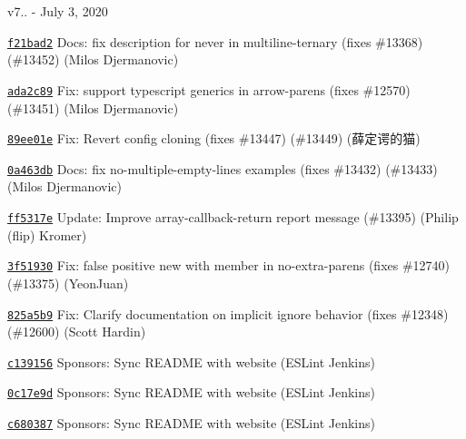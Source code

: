 v7.. -\/ July 3, 2020


\begin{DoxyItemize}
\item \href{https://github.com/eslint/eslint/commit/f21bad2680406a2671b877f8dba47f4475d0cc64}{\texttt{ {\ttfamily f21bad2}}} Docs\+: fix description for {\ttfamily never} in multiline-\/ternary (fixes \#13368) (\#13452) (Milos Djermanovic)
\item \href{https://github.com/eslint/eslint/commit/ada2c891298382f82dfabf37cacd59a1057b2bb7}{\texttt{ {\ttfamily ada2c89}}} Fix\+: support typescript generics in arrow-\/parens (fixes \#12570) (\#13451) (Milos Djermanovic)
\item \href{https://github.com/eslint/eslint/commit/89ee01e083f1e02293bf8d1447f9b0fdb3cb9384}{\texttt{ {\ttfamily 89ee01e}}} Fix\+: Revert config cloning (fixes \#13447) (\#13449) (薛定谔的猫)
\item \href{https://github.com/eslint/eslint/commit/0a463dbf7cc5a77d442879c9117204d4d38db972}{\texttt{ {\ttfamily 0a463db}}} Docs\+: fix no-\/multiple-\/empty-\/lines examples (fixes \#13432) (\#13433) (Milos Djermanovic)
\item \href{https://github.com/eslint/eslint/commit/ff5317e93425f93cfdf808609551ee67b2032543}{\texttt{ {\ttfamily ff5317e}}} Update\+: Improve array-\/callback-\/return report message (\#13395) (Philip (flip) Kromer)
\item \href{https://github.com/eslint/eslint/commit/3f51930eea7cddc921a9ee3cb0328c7b649c0f83}{\texttt{ {\ttfamily 3f51930}}} Fix\+: false positive new with member in no-\/extra-\/parens (fixes \#12740) (\#13375) (Yeon\+Juan)
\item \href{https://github.com/eslint/eslint/commit/825a5b98d3d84f6eb72b75f7d8519de763cc8898}{\texttt{ {\ttfamily 825a5b9}}} Fix\+: Clarify documentation on implicit ignore behavior (fixes \#12348) (\#12600) (Scott Hardin)
\item \href{https://github.com/eslint/eslint/commit/c1391566a5f765f25716527de7b5cdee16c0ce36}{\texttt{ {\ttfamily c139156}}} Sponsors\+: Sync README with website (ESLint Jenkins)
\item \href{https://github.com/eslint/eslint/commit/0c17e9d2ac307cc288eea6ed7971bd5a7d33321a}{\texttt{ {\ttfamily 0c17e9d}}} Sponsors\+: Sync README with website (ESLint Jenkins)
\item \href{https://github.com/eslint/eslint/commit/c680387ba61f6dccf0390d24a85d871fa83e9fea}{\texttt{ {\ttfamily c680387}}} Sponsors\+: Sync README with website (ESLint Jenkins)

\end{DoxyItemize}
